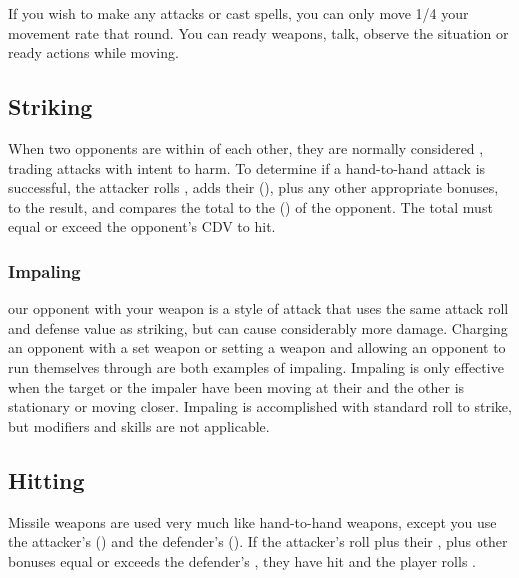 \begin{multicols*}{2}
If you wish to make any attacks or cast spells, you can only move 1/4 your movement rate that round. You can ready weapons, talk, observe the situation or ready actions while moving.

\subsection{Striking}
When two opponents are within  of each other, they are normally considered , trading attacks with intent to harm. To determine if a hand-to-hand attack is successful, the attacker rolls , adds their  (\CM), plus any other appropriate bonuses, to the result, and compares the total to the  (\CDV) of the opponent. The total must equal or exceed the opponent's CDV to hit.

\subsubsection{Impaling}
 our opponent with your weapon is a style of attack that uses the same attack roll and defense value as striking, but can cause considerably more damage. Charging an opponent with a set weapon or setting a weapon and allowing an opponent to run themselves through are both examples of impaling. Impaling is only effective when the target or the impaler have been moving at their  and the other is stationary or moving closer. Impaling is accomplished with  standard roll to strike, but modifiers and skills are not applicable.
\subsection{Hitting}
Missile weapons are used very much like hand-to-hand weapons, except you use the attacker's  (\MM) and the defender's  (\MDV). If the attacker's  roll plus their \MM, plus other bonuses equal or exceeds the defender's \MDV, they have hit and the player rolls .

\end{multicols*}
